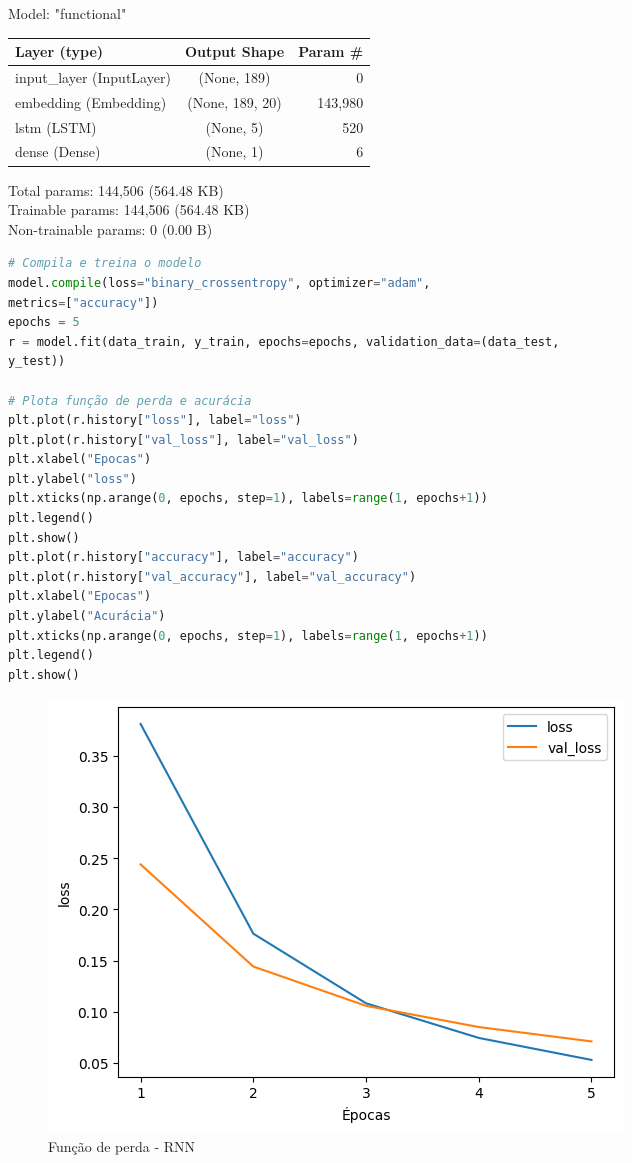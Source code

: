 \begin{tcolorbox}[myoutputstyle]
Model: "functional"
\begin{table}[H]
\begin{tabular}{|l|c|r|}
\hline
\textbf{Layer (type)} & \textbf{Output Shape} & \textbf{Param \#} \\ \hline
input\_layer (InputLayer) & (None, 189) & 0 \\ \hline
embedding (Embedding) & (None, 189, 20) & 143,980 \\ \hline
lstm (LSTM) & (None, 5) & 520 \\ \hline
dense (Dense) & (None, 1) & 6 \\ \hline
\end{tabular}
\end{table}
 Total params: 144,506 (564.48 KB)\\
 Trainable params: 144,506 (564.48 KB)\\
 Non-trainable params: 0 (0.00 B)
\end{tcolorbox}

\begin{lstlisting}[language=Python, style=input]
# Compila e treina o modelo
model.compile(loss="binary_crossentropy", optimizer="adam",
metrics=["accuracy"])
epochs = 5
r = model.fit(data_train, y_train, epochs=epochs, validation_data=(data_test,
y_test))

# Plota função de perda e acurácia
plt.plot(r.history["loss"], label="loss")
plt.plot(r.history["val_loss"], label="val_loss")
plt.xlabel("Epocas")
plt.ylabel("loss")
plt.xticks(np.arange(0, epochs, step=1), labels=range(1, epochs+1))
plt.legend()
plt.show()
plt.plot(r.history["accuracy"], label="accuracy")
plt.plot(r.history["val_accuracy"], label="val_accuracy")
plt.xlabel("Epocas")
plt.ylabel("Acurácia")
plt.xticks(np.arange(0, epochs, step=1), labels=range(1, epochs+1))
plt.legend()
plt.show()
\end{lstlisting}


\begin{figure}[H]
\centering
\includegraphics[width=.8\linewidth]{apendices/fig/9_IAA009_5.png}
\caption{Função de perda - RNN}
\end{figure}

